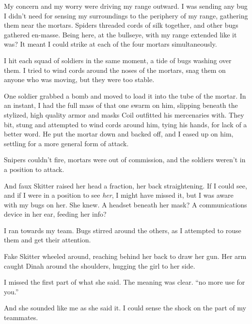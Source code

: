 My concern and my worry were driving my range outward.  I was sending any bug I didn't need for sensing my surroundings to the periphery of my range, gathering them near the mortars.  Spiders threaded cords of silk together, and other bugs gathered en-masse.  Being here, at the bullseye, with my range extended like it was?  It meant I could strike at each of the four mortars simultaneously.



I hit each squad of soldiers in the same moment, a tide of bugs washing over them.  I tried to wind cords around the noses of the mortars, snag them on anyone who was moving, but they were too stable.



One soldier grabbed a bomb and moved to load it into the tube of the mortar.  In an instant, I had the full mass of that one swarm on him, slipping beneath the stylized, high quality armor and masks Coil outfitted his mercenaries with.  They bit, stung and attempted to wind cords around him, tying his hands, for lack of a better word.  He put the mortar down and backed off, and I eased up on him, settling for a more general form of attack.



Snipers couldn't fire, mortars were out of commission, and the soldiers weren't in a position to attack.



And faux Skitter raised her head a fraction, her back straightening.  If I could see, and if I were in a position to see \emph{her}, I might have missed it, but I was aware with my bugs on her. She knew.  A headset beneath her mask?  A communications device in her ear, feeding her info?



I ran towards my team.  Bugs stirred around the others, as I attempted to rouse them and get their attention.



Fake Skitter wheeled around, reaching behind her back to draw her gun.  Her arm caught Dinah around the shoulders, hugging the girl to her side.



I missed the first part of what she said.  The meaning was clear.  ``\ldotsgot no more use for you.''



And she sounded like me as she said it.  I could sense the shock on the part of my teammates.



